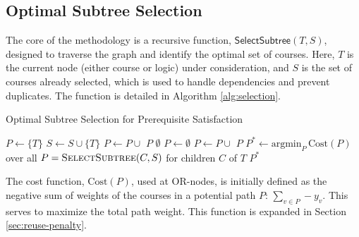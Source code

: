 \documentclass[11pt]{article}
\begin{document}
\subsection{Optimal Subtree Selection}

The core of the methodology is a recursive function, $\mathsf{SelectSubtree}(T, S)$, designed to traverse the graph and identify the optimal set of courses. Here, $T$ is the current node (either course or logic) under consideration, and $S$ is the set of courses already selected, which is used to handle dependencies and prevent duplicates. The function is detailed in Algorithm \ref{alg:selection}.

\begin{algorithm}[H]
\caption{Optimal Subtree Selection for Prerequisite Satisfaction}
\label{alg:selection}
\begin{algorithmic}[1]
            \State $P \gets \{T\}$
            \State $S \gets S \cup \{T\}$
                \State $P \gets P \cup$ 
            \EndFor
            \State\Return $P$
        \Else
            \State\Return $\emptyset$
        \EndIf
        \State $P \gets \emptyset$
            \State $P \gets P \cup$ 
        \EndFor
        \State\Return $P$
        \State $P^* \gets \text{argmin}_P\, \mathrm{Cost}(P)$ over all $P = \Call{SelectSubtree}{C, S}$ for children $C$ of $T$
        \State\Return $P^*$
    \EndIf
\EndFunction
\end{algorithmic}
\end{algorithm}

The cost function, $\mathrm{Cost}(P)$, used at OR-nodes, is initially defined as the negative sum of weights of the courses in a potential path $P$: $\sum_{v \in P} -y_v$. This serves to maximize the total path weight. This function is expanded in Section \ref{sec:reuse-penalty}.
\end{document}
